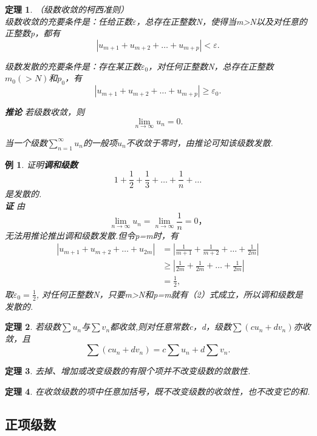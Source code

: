 \documentclass[12pt, UTF8, AutoFakeBold]{ctexart} %
\newtheorem{theorem}{定理}[section]
\newtheorem{example}{例}[section]
\newcommand{\limn}{\lim_{n\to\infty}} %
\begin{document}
\begin{tcolorbox}[colback=yellow!20, colframe=red!80!black]
    \begin{theorem}
        （级数收敛的柯西准则）\\
        级数收敛的充要条件是：任给正数$\varepsilon$，总存在正整数N，使得当m>N以及对任意的正整数p，都有
        \begin{equation}
            |u_{m+1} + u_{m+2} + \dots + u_{m+p}| < \varepsilon. \tag{1}
        \end{equation}

        级数发散的充要条件是：存在某正数$\varepsilon_0$，对任何正整数N，总存在正整数$m_0(>N)$和$p_0$，有
        \begin{equation}
            |u_{m+1} + u_{m+2} + \dots + u_{m+p}| \geq  \varepsilon_0. \tag{2}
        \end{equation}

        \textbf{推论} 若级数收敛，则
        \[
            \lim\limits_{n \to \infty} u_n = 0.
        \]

            当一个级数$\sum\limits_{n = 1}^{\infty}u_n$的一般项$u_n$不收敛于零时，由推论可知该级数发散.
    \end{theorem}
\end{tcolorbox}

\begin{example}
    证明\textbf{\kaishu 调和级数}
    \[
        1 + \frac{1}{2} + \frac{1}{3} + \dots + \frac{1}{n} + \dots
    \]
    是发散的.\\
    \textbf{证} 由
    \[
        \limn u_n = \limn \frac{1}{n} = 0，
    \]
    无法用推论推出调和级数发散.但令p=m时，有
    \[
    \begin{aligned}
        |u_{m+1} + u_{m+2} + \dots + u_{2m}| &= |\frac{1}{m + 1} + \frac{1}{m + 2} + \dots + \frac{1}{2m}|\\
        &\geq |\frac{1}{2m} + \frac{1}{2m} + \dots + \frac{1}{2m}|\\
        &= \frac{1}{2},
    \end{aligned}
    \]
    取$\varepsilon_0 = \frac{1}{2}$, 对任何正整数N，只要m>N和p=m就有（2）式成立，所以调和级数是发散的.
\end{example}

\begin{theorem}
    若级数$\sum u_n$与$\sum v_n$都收敛,则对任意常数c，d，级数$\sum (cu_n+dv_n)$亦收敛，且
    \[
        \sum (cu_n+dv_n) = c\sum u_n+d\sum v_n.
    \]
\end{theorem}

\begin{theorem}
    去掉、增加或改变级数的有限个项并不改变级数的敛散性.
\end{theorem}

\begin{theorem}
    在收敛级数的项中任意加括号，既不改变级数的收敛性，也不改变它的和.
\end{theorem}

\subsection{正项级数}
\end{document}
